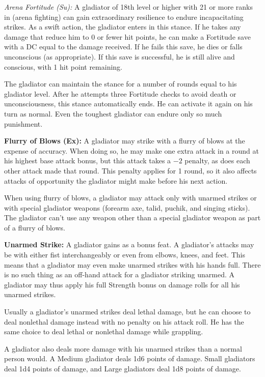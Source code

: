 \textit{Arena Fortitude (Su):} A gladiator of 18th level or higher with 21 or more ranks in  (arena fighting) can gain extraordinary resilience to endure incapacitating strikes. As a swift action, the gladiator enters in this stance. If he takes any damage that reduce him to 0 or fewer hit points, he can make a Fortitude save with a DC equal to the damage received. If he fails this save, he dies or falls unconscious (as appropriate). If this save is successful, he is still alive and conscious, with 1 hit point remaining.

The gladiator can maintain the stance for a number of rounds equal to his gladiator level. After he attempts three Fortitude checks to avoid death or unconsciousness, this stance automatically ends. He can activate it again on his turn as normal. Even the toughest gladiator can endure only so much punishment.

\textbf{Flurry of Blows (Ex):} A gladiator may strike with a flurry of blows at the expense of accuracy. When doing so, he may make one extra attack in a round at his highest base attack bonus, but this attack takes a $-2$ penalty, as does each other attack made that round. This penalty applies for 1 round, so it also affects attacks of opportunity the gladiator might make before his next action. 

When using flurry of blows, a gladiator may attack only with unarmed strikes or with special gladiator weapons (forearm axe, talid, puchik, and singing sticks). The gladiator can't use any weapon other than a special gladiator weapon as part of a flurry of blows.

\textbf{Unarmed Strike:} A gladiator gains  as a bonus feat. A gladiator's attacks may be with either fist interchangeably or even from elbows, knees, and feet. This means that a gladiator may even make unarmed strikes with his hands full. There is no such thing as an off-hand attack for a gladiator striking unarmed. A gladiator may thus apply his full Strength bonus on damage rolls for all his unarmed strikes.

Usually a gladiator's unarmed strikes deal lethal damage, but he can choose to deal nonlethal damage instead with no penalty on his attack roll. He has the same choice to deal lethal or nonlethal damage while grappling.

A gladiator also deals more damage with his unarmed strikes than a normal person would. A Medium gladiator deals 1d6 points of damage. Small gladiators deal 1d4 points of damage, and Large gladiators deal 1d8 points of damage.

